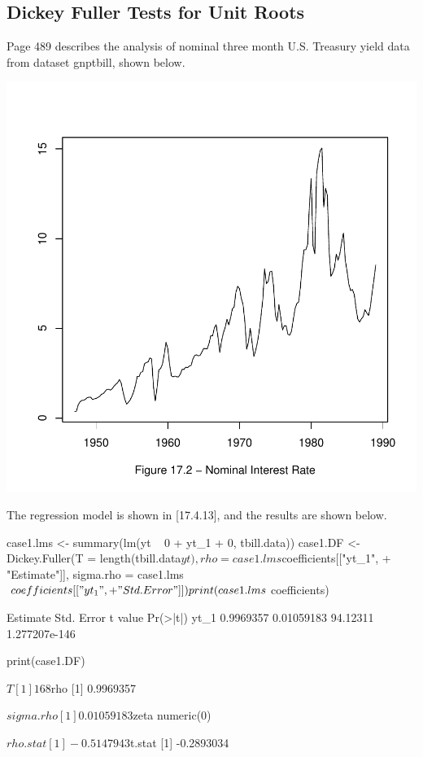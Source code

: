 \documentclass[a4paper]{article}
\renewcommand{\~}{\perispomeni}%
\begin{document}
\subsection{Dickey Fuller Tests for Unit Roots}
Page 489 describes the analysis of nominal
three month U.S. Treasury
yield data from
dataset gnptbill, shown below.
\begin{Schunk}
\end{Schunk}
\begin{center}
\includegraphics{Companion-052}
\end{center}
The regression model is shown in [17.4.13], and the results are shown below.
\begin{Schunk}
\begin{Sinput}
 case1.lms <- summary(lm(yt ~ 0 + yt_1 + 0, tbill.data))
 case1.DF <- Dickey.Fuller(T = length(tbill.data$yt), rho = case1.lms$coefficients[["yt_1", 
+     "Estimate"]], sigma.rho = case1.lms$coefficients[["yt_1", 
+     "Std. Error"]])
 print(case1.lms$coefficients)
\end{Sinput}
\begin{Soutput}
      Estimate Std. Error  t value      Pr(>|t|)
yt_1 0.9969357 0.01059183 94.12311 1.277207e-146
\end{Soutput}
\begin{Sinput}
 print(case1.DF)
\end{Sinput}
\begin{Soutput}
$T
[1] 168

$rho
[1] 0.9969357

$sigma.rho
[1] 0.01059183

$zeta
numeric(0)

$rho.stat
[1] -0.5147943

$t.stat
[1] -0.2893034
\end{Soutput}
\end{Schunk}
\end{document}
